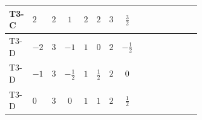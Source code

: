 \documentclass[8pt]{article}
\begin{document}
\begin{landscape}
\begin{longtable}{@{}llcccccc >{\raggedright\arraybackslash}p{0.21\linewidth} >{\raggedright\arraybackslash}p{0.21\linewidth} >{\raggedright\arraybackslash}p{0.21\linewidth}@{}}
\midrule
T3-C & $2$ & $2$ & $1$ & $2$ & $2$ & $3$ & $\frac{3}{2}$ & \scriptsize\adjustbox{max width=\linewidth}{$\begin{gathered} - 3 C_{5} g_{2}^{2}\end{gathered}$} & \scriptsize\adjustbox{max width=\linewidth}{$\begin{gathered} 2 C_{5} \lambda_1\end{gathered}$} & \scriptsize\adjustbox{max width=\linewidth}{$\begin{gathered} - C_{5} Y_e Y_e^\dagger\end{gathered}$} \\
\midrule
T3-D & $-2$ & $3$ & $-1$ & $1$ & $0$ & $2$ & $-\frac{1}{2}$ & \scriptsize\adjustbox{max width=\linewidth}{$\begin{gathered} - 3 C_{5} g_{2}^{2}\end{gathered}$} & \scriptsize\adjustbox{max width=\linewidth}{$\begin{gathered} 2 C_{5} \lambda_1\end{gathered}$} & \scriptsize\adjustbox{max width=\linewidth}{$\begin{gathered} - C_{5} Y_e Y_e^\dagger\end{gathered}$} \\
\midrule
T3-D & $-1$ & $3$ & $-\frac{1}{2}$ & $1$ & $\frac{1}{2}$ & $2$ & $0$ & \scriptsize\adjustbox{max width=\linewidth}{$\begin{gathered} - 3 C_{5} g_{2}^{2}\end{gathered}$} & \scriptsize\adjustbox{max width=\linewidth}{$\begin{gathered} 2 C_{5} \lambda_1\end{gathered}$} & \scriptsize\adjustbox{max width=\linewidth}{$\begin{gathered} - C_{5} Y_e Y_e^\dagger\end{gathered}$} \\
\midrule
T3-D & $0$ & $3$ & $0$ & $1$ & $1$ & $2$ & $\frac{1}{2}$ & \scriptsize\adjustbox{max width=\linewidth}{$\begin{gathered} - 3 C_{5} g_{2}^{2}\end{gathered}$} & \scriptsize\adjustbox{max width=\linewidth}{$\begin{gathered} 2 C_{5} \lambda_1\end{gathered}$} & \scriptsize\adjustbox{max width=\linewidth}{$\begin{gathered} - C_{5} Y_e Y_e^\dagger\end{gathered}$} \\

\end{longtable}
\end{landscape}
\end{document}
